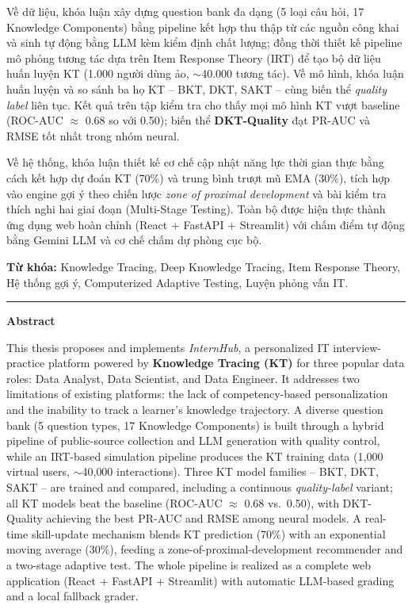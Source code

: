 \documentclass[12pt, a4paper]{report}
\newcommand{\system}{\textit{InternHub}}
\begin{document}
Về dữ liệu, khóa luận xây dựng question bank đa dạng (5 loại câu hỏi, 17 Knowledge Components) bằng pipeline kết hợp thu thập từ các nguồn công khai và sinh tự động bằng LLM kèm kiểm định chất lượng; đồng thời thiết kế pipeline mô phỏng tương tác dựa trên Item Response Theory (IRT) để tạo bộ dữ liệu huấn luyện KT (1.000 người dùng ảo, $\sim$40.000 tương tác). Về mô hình, khóa luận huấn luyện và so sánh ba họ KT -- BKT, DKT, SAKT -- cùng biến thể \textit{quality label} liên tục. Kết quả trên tập kiểm tra cho thấy mọi mô hình KT vượt baseline (ROC-AUC $\approx$ 0.68 so với 0.50); biến thể \textbf{DKT-Quality} đạt PR-AUC và RMSE tốt nhất trong nhóm neural.

Về hệ thống, khóa luận thiết kế cơ chế cập nhật năng lực thời gian thực bằng cách kết hợp dự đoán KT (70\%) và trung bình trượt mũ EMA (30\%), tích hợp vào engine gợi ý theo chiến lược \textit{zone of proximal development} và bài kiểm tra thích nghi hai giai đoạn (Multi-Stage Testing). Toàn bộ được hiện thực thành ứng dụng web hoàn chỉnh (React + FastAPI + Streamlit) với chấm điểm tự động bằng Gemini LLM và cơ chế chấm dự phòng cục bộ.

\textbf{Từ khóa:} Knowledge Tracing, Deep Knowledge Tracing, Item Response Theory, Hệ thống gợi ý, Computerized Adaptive Testing, Luyện phỏng vấn IT.

\vspace{0.6cm}
\begin{center}\rule{0.5\textwidth}{0.4pt}\end{center}
\vspace{0.3cm}

\noindent\textbf{\large Abstract}

\smallskip
This thesis proposes and implements \system{}, a personalized IT interview-practice platform powered by \textbf{Knowledge Tracing (KT)} for three popular data roles: Data Analyst, Data Scientist, and Data Engineer. It addresses two limitations of existing platforms: the lack of competency-based personalization and the inability to track a learner's knowledge trajectory. A diverse question bank (5 question types, 17 Knowledge Components) is built through a hybrid pipeline of public-source collection and LLM generation with quality control, while an IRT-based simulation pipeline produces the KT training data (1{,}000 virtual users, $\sim$40{,}000 interactions). Three KT model families -- BKT, DKT, SAKT -- are trained and compared, including a continuous \textit{quality-label} variant; all KT models beat the baseline (ROC-AUC $\approx$ 0.68 vs.\ 0.50), with DKT-Quality achieving the best PR-AUC and RMSE among neural models. A real-time skill-update mechanism blends KT prediction (70\%) with an exponential moving average (30\%), feeding a zone-of-proximal-development recommender and a two-stage adaptive test. The whole pipeline is realized as a complete web application (React + FastAPI + Streamlit) with automatic LLM-based grading and a local fallback grader.
\end{document}
